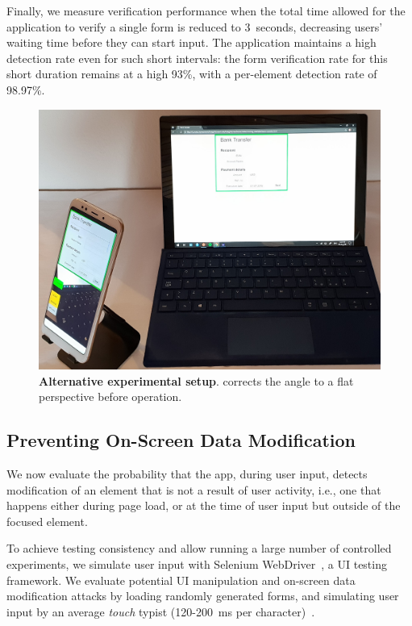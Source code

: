 Finally, we measure verification performance when the total time allowed for the application to verify a single form is reduced to 3~seconds, decreasing users' waiting time before they can start input.
The application maintains a high detection rate even for such short intervals: the form verification rate for this short duration remains at a high 93\%, with a per-element detection rate of 98.97\%.

\begin{figure}[t]
	\centering
	\includegraphics[width=0.7\columnwidth]{img/ExperimentalSetupRightAngle2.jpg}
	\caption{
		\textbf{Alternative experimental setup}.
		\name corrects the angle to a flat perspective before operation.
	} \label{fig:experimentalSetupRightAngle}
\end{figure}




\subsection{Preventing On-Screen Data Modification} \label{ssec:inputSupervisionEvaluation}

We now evaluate the probability that the \sysname app, during user input, detects modification of an element that is not a result of user activity, i.e., one that happens either during page load, or at the time of user input but outside of the focused element.

To achieve testing consistency and allow running a large number of controlled experiments, we simulate user input with Selenium WebDriver~\cite{seleniumWebDriver}, a UI testing framework.
We evaluate potential UI manipulation and on-screen data modification attacks by loading randomly generated forms, and simulating user input by an average \textit{touch} typist (120-200~ms per character)~\cite{pereira2013effect}.

